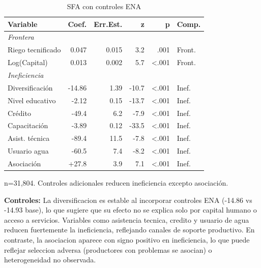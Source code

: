\documentclass[10pt,a4paper]{article}
\begin{document}
\begin{table}[H]
\centering
\caption{SFA con controles ENA}
\label{tab:sfa_controls}
\begin{threeparttable}
\small
\begin{tabular}{lrrrrl}
\toprule
\textbf{Variable} & \textbf{Coef.} & \textbf{Err.Est.} & \textbf{z} & \textbf{p} & \textbf{Comp.} \\
\midrule
\multicolumn{6}{l}{\textit{Frontera}} \\
Riego tecnificado & 0.047 & 0.015 & 3.2 & .001 & Front. \\
Log(Capital) & 0.013 & 0.002 & 5.7 & <.001 & Front. \\
\midrule
\multicolumn{6}{l}{\textit{Ineficiencia}} \\
Diversificación & -14.86 & 1.39 & -10.7 & <.001 & Inef. \\
Nivel educativo & -2.12 & 0.15 & -13.7 & <.001 & Inef. \\
Crédito & -49.4 & 6.2 & -7.9 & <.001 & Inef. \\
Capacitación & -3.89 & 0.12 & -33.5 & <.001 & Inef. \\
Asist. técnica & -89.4 & 11.5 & -7.8 & <.001 & Inef. \\
Usuario agua & -60.5 & 7.4 & -8.2 & <.001 & Inef. \\
Asociación & +27.8 & 3.9 & 7.1 & <.001 & Inef. \\
\bottomrule
\end{tabular}
\begin{tablenotes}
\footnotesize
\item n=31,804. Controles adicionales reducen ineficiencia excepto asociación.
\end{tablenotes}
\end{threeparttable}
\end{table}

\textbf{Controles:} La diversificacion es estable al incorporar controles ENA (-14.86 vs -14.93 base), lo que sugiere que su efecto no se explica solo por capital humano o acceso a servicios. Variables como asistencia tecnica, credito y usuario de agua reducen fuertemente la ineficiencia, reflejando canales de soporte productivo. En contraste, la asociacion aparece con signo positivo en ineficiencia, lo que puede reflejar seleccion adversa (productores con problemas se asocian) o heterogeneidad no observada.
\end{document}

